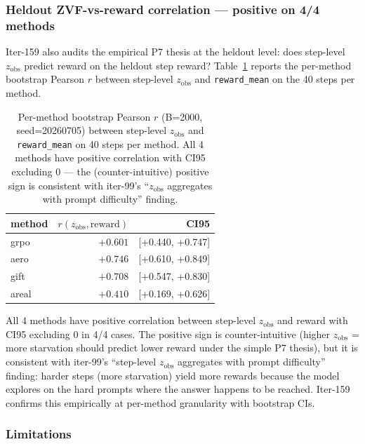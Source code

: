 \subsubsection*{Heldout ZVF-vs-reward correlation --- positive on 4/4 methods}

Iter-159 also audits the empirical P7 thesis at the heldout level: does
step-level $z_{\mathrm{obs}}$ predict reward on the heldout step reward?
Table~\ref{tab:p7-iter159-zvf-reward} reports the per-method bootstrap
Pearson $r$ between step-level $z_{\mathrm{obs}}$ and \texttt{reward\_mean}
on the 40 steps per method.

\begin{table}[ht]
\centering
\small
\begin{tabular}{lrr}
\toprule
method & $r(z_{\mathrm{obs}}, \mathrm{reward})$ & CI95 \\
\midrule
grpo  & $+0.601$ & [+0.440, +0.747] \\
aero  & $+0.746$ & [+0.610, +0.849] \\
gift  & $+0.708$ & [+0.547, +0.830] \\
areal & $+0.410$ & [+0.169, +0.626] \\
\bottomrule
\end{tabular}
\caption{Per-method bootstrap Pearson $r$ (B=2000, seed=20260705) between
step-level $z_{\mathrm{obs}}$ and \texttt{reward\_mean} on 40 steps per method.
All 4 methods have positive correlation with CI95 excluding 0 --- the
(counter-intuitive) positive sign is consistent with iter-99's ``$z_{\mathrm{obs}}$
aggregates with prompt difficulty'' finding.}
\label{tab:p7-iter159-zvf-reward}
\end{table}

All 4 methods have positive correlation between step-level $z_{\mathrm{obs}}$
and reward with CI95 excluding 0 in 4/4 cases. The positive sign is
counter-intuitive (higher $z_{\mathrm{obs}}$ = more starvation should
predict lower reward under the simple P7 thesis), but it is consistent with
iter-99's ``step-level $z_{\mathrm{obs}}$ aggregates with prompt difficulty''
finding: harder steps (more starvation) yield more rewards because the model
explores on the hard prompts where the answer happens to be reached. Iter-159
confirms this empirically at per-method granularity with bootstrap CIs.

\subsubsection*{Limitations}

